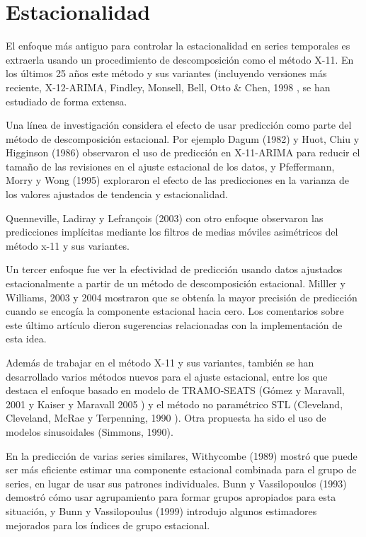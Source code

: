\documentclass{llncs}
\begin{document}
\section{Estacionalidad}
El enfoque más antiguo para controlar la estacionalidad en series temporales es extraerla usando un procedimiento de descomposición como el método X-11. En los últimos 25 años este método y sus variantes (incluyendo versiones más reciente, X-12-ARIMA, Findley, Monsell, Bell, Otto & Chen, 1998 \cite{-}, se han estudiado de forma extensa.

Una línea de investigación considera el efecto de usar predicción como parte del método de descomposición estacional. Por ejemplo Dagum (1982) \cite{-} y Huot, Chiu y Higginson (1986) \cite{-} observaron el uso de predicción en X-11-ARIMA para reducir el tamaño de las revisiones en el ajuste estacional de los datos, y Pfeffermann, Morry y Wong (1995) exploraron el efecto de las predicciones en la  varianza de los valores ajustados de tendencia y estacionalidad.

Quenneville, Ladiray y Lefrançois (2003) con otro enfoque observaron las predicciones implícitas mediante los filtros de medias móviles asimétricos del método x-11 y sus variantes.

Un tercer enfoque fue ver la efectividad de predicción usando datos ajustados estacionalmente a partir de un método de descomposición estacional. Milller y Williams, 2003 \cite{-} y 2004 \cite{-} mostraron que se obtenía la mayor precisión de predicción cuando se encogía la componente estacional hacia cero.  Los comentarios sobre este último artículo dieron sugerencias relacionadas con la implementación de esta idea.

Además de trabajar en el método X-11 y sus variantes, también se han desarrollado varios métodos nuevos para el ajuste estacional, entre los que destaca el enfoque basado en modelo de TRAMO-SEATS (Gómez y Maravall, 2001 \cite{-} y Kaiser y Maravall 2005 \cite{-}) y el método no paramétrico STL (Cleveland, Cleveland, McRae y Terpenning, 1990 \cite{-}). Otra propuesta ha sido el uso de modelos sinusoidales (Simmons, 1990).

En la predicción de varias series similares, Withycombe (1989) \cite{-} mostró que puede ser más eficiente estimar una componente estacional combinada para el grupo de series, en lugar de usar sus patrones individuales. Bunn y Vassilopoulos (1993) \cite{-} demostró cómo usar agrupamiento para formar grupos apropiados para esta situación, y Bunn y Vassilopoulus (1999)\cite{-} introdujo algunos estimadores mejorados para los índices de grupo estacional.
\end{document}
